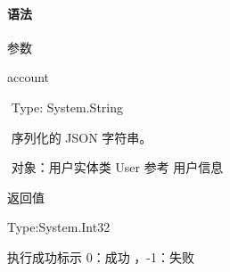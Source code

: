 \documentclass[letterpaper,10pt,english]{sphinxmanual}
\begin{document}
\paragraph{语法}
\label{\detokenize{csharp_activex:id35}}
%
\begin{sphinxVerbatim}[commandchars=\\\{\}]
   
\end{sphinxVerbatim}

参数

account

​ Type: System.String

​ 序列化的 JSON 字符串。

​ 对象：用户实体类 User 参考 用户信息

返回值

Type:System.Int32

执行成功标示 0：成功 ，-1：失败
\end{document}
